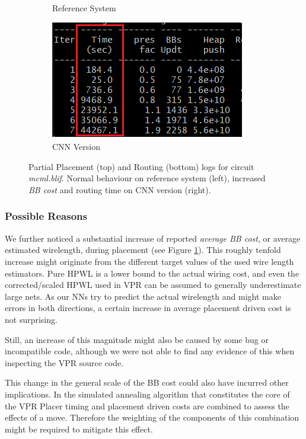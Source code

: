 \begin{figure}
\begin{subfigure}[b]{0.49\linewidth}
		\caption{Reference System}
	\end{subfigure}
	\hfill
	\begin{subfigure}[b]{0.49\linewidth}
		\includegraphics[width=\linewidth]{plots/log_route_cnn.png}
		\caption{\gls{CNN} Version}
	\end{subfigure}
	\caption{Partial Placement (top) and Routing (bottom) logs for circuit \textit{mcml.blif}. Normal behaviour on reference system (left), increased \textit{\gls{BB} cost} and routing time on \gls{CNN} version (right).}
	\label{fig:eval-problem-logs}
\end{figure}

\subsubsection{Possible Reasons}

We further noticed a substantial increase of reported \textit{average \gls{BB} cost}, or average estimated wirelength, during placement (see Figure \ref{fig:eval-problem-logs}). This roughly tenfold increase might originate from the different target values of the used wire length estimators. Pure \gls{HPWL} is a lower bound to the actual wiring cost, and even the corrected/scaled \gls{HPWL} used in \gls{VPR} can be assumed to generally underestimate large nets. As our \glspl{NN} try to predict the actual wirelength and might make errors in both directions, a certain increase in average placement driven cost is not surprising.

Still, an increase of this magnitude might also be caused by some bug or incompatible code, although we were not able to find any evidence of this when inspecting the \gls{VPR} source code.

This change in the general scale of the \gls{BB} cost could also have incurred other implications. In the simulated annealing algorithm that constitutes the core of the \gls{VPR} Placer timing and placement driven costs are combined to assess the effects of a move. Therefore the weighting of the components of this combination might be required to mitigate this effect.

